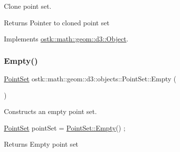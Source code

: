 Clone point set. 

\begin{DoxyReturn}{Returns}
Pointer to cloned point set 
\end{DoxyReturn}


Implements \hyperlink{classostk_1_1math_1_1geom_1_1d3_1_1_object_a676013f9555f6492687f9809b2db887b}{ostk\+::math\+::geom\+::d3\+::\+Object}.

\mbox{\label{classostk_1_1math_1_1geom_1_1d3_1_1objects_1_1_point_set_a1b14ed7d73ee7ac5e2796cf44f06ffe9}} 
\subsubsection{\texorpdfstring{Empty()}{Empty()}}
{\footnotesize\ttfamily \hyperlink{classostk_1_1math_1_1geom_1_1d3_1_1objects_1_1_point_set}{Point\+Set} ostk\+::math\+::geom\+::d3\+::objects\+::\+Point\+Set\+::\+Empty (\begin{DoxyParamCaption}{ }\end{DoxyParamCaption})\hspace{0.3cm}{\ttfamily [static]}}



Constructs an empty point set. 


\begin{DoxyCode}
\hyperlink{classostk_1_1math_1_1geom_1_1d3_1_1objects_1_1_point_set_a285835d8348a60ceaf227bd76e3a5546}{PointSet} pointSet = \hyperlink{classostk_1_1math_1_1geom_1_1d3_1_1objects_1_1_point_set_a1b14ed7d73ee7ac5e2796cf44f06ffe9}{PointSet::Empty}() ;
\end{DoxyCode}


\begin{DoxyReturn}{Returns}
Empty point set 
\end{DoxyReturn}
\mbox{\label{classostk_1_1math_1_1geom_1_1d3_1_1objects_1_1_point_set_ad15fd1b2a3609d6e24657118945b579f}} 
